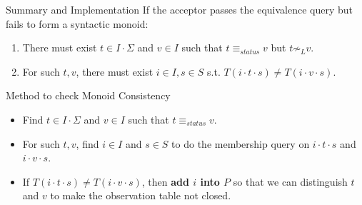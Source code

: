 \documentclass{beamer}
\begin{document}
\begin{frame}{Summary and Implementation}
    If the acceptor passes the equivalence query but fails to form a syntactic monoid:
    \begin{enumerate}
        \item There must exist $t \in I \cdot \Sigma$ and $v \in I$ such that $t \equiv_{status} v$ but $t \not\sim_L v$.
        \item For such $t, v$, there must exist $i \in I, s \in S$ s.t. $T(i \cdot t \cdot s) \neq T(i \cdot v \cdot s)$.
    \end{enumerate}

    \begin{block}{Method to check Monoid Consistency}
        \begin{itemize}
            \item Find $t \in I \cdot \Sigma$ and $v \in I$ such that $t \equiv_{status} v$.
            \item For such $t, v$, find $i \in I$ and $s \in S$ to do the membership query on $i \cdot t \cdot s$ and $i \cdot v \cdot s$.
            \item If $T(i \cdot t \cdot s) \neq T(i \cdot v \cdot s)$, then \textbf{add $i$ into $P$} so that we can distinguish $t$ and $v$ to make the observation table not closed.
        \end{itemize}
    \end{block}
\end{frame}
\end{document}
